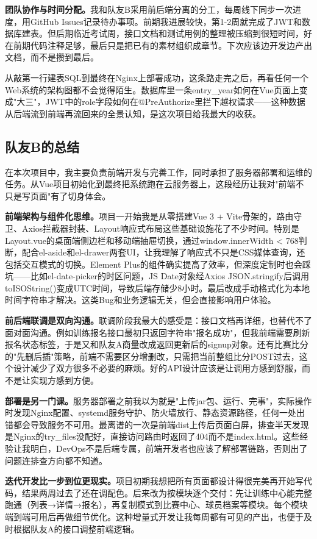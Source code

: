 \documentclass[12pt,a4paper]{ctexart}
\begin{document}
\textbf{团队协作与时间分配。}我和队友B采用前后端分离的分工，每周线下同步一次进度，用GitHub Issues记录待办事项。前期我进展较快，第1-2周就完成了JWT和数据库建表。但后期临近考试周，接口文档和测试用例的整理被压缩到很短时间，好在前期代码注释足够，最后只是把已有的素材组织成章节。下次应该边开发边产出文档，而不是攒到最后。

从敲第一行建表SQL到最终在Nginx上部署成功，这条路走完之后，再看任何一个Web系统的架构图都不会觉得陌生。数据库里一条entry\_year如何在Vue页面上变成"大三"，JWT中的role字段如何在@PreAuthorize里拦下越权请求——这种数据从后端流到前端再流回来的全景认知，是这次项目给我最大的收获。

\subsection{队友B的总结}

在本次项目中，我主要负责前端开发与完善工作，同时承担了服务器部署和运维的任务。从Vue项目初始化到最终把系统跑在云服务器上，这段经历让我对"前端不只是写页面"有了切身体会。

\textbf{前端架构与组件化思维。}项目一开始我是从零搭建Vue 3 + Vite骨架的，路由守卫、Axios拦截器封装、Layout响应式布局这些基础设施花了不少时间。特别是Layout.vue的桌面端侧边栏和移动端抽屉切换，通过window.innerWidth < 768判断，配合el-aside和el-drawer两套UI，让我理解了响应式不只是CSS媒体查询，还包括交互模式的切换。Element Plus的组件确实提高了效率，但深度定制时也会踩坑——比如el-date-picker的时区问题，JS Date对象经Axios JSON.stringify后调用toISOString()变成UTC时间，导致后端存储少8小时。最后改成手动格式化为本地时间字符串才解决。这类Bug和业务逻辑无关，但会直接影响用户体验。

\textbf{前后端联调是双向沟通。}联调阶段我最大的感受是：接口文档再详细，也替代不了面对面沟通。例如训练报名接口最初只返回字符串"报名成功"，但我前端需要刷新报名状态标签，于是又和队友A商量改成返回更新后的signup对象。还有比赛比分的"先删后插"策略，前端不需要区分增删改，只需把当前整组比分POST过去，这个设计减少了双方很多不必要的麻烦。好的API设计应该是让调用方感到舒服，而不是让实现方感到方便。

\textbf{部署是另一门课。}服务器部署之前我以为就是"上传jar包、运行、完事"，实际操作时发现Nginx配置、systemd服务守护、防火墙放行、静态资源路径，任何一处出错都会导致服务不可用。最离谱的一次是前端dist上传后页面白屏，排查半天发现是Nginx的try\_files没配好，直接访问路由时返回了404而不是index.html。这些经验让我明白，DevOps不是后端专属，前端开发者也应该了解部署链路，否则出了问题连排查方向都不知道。

\textbf{迭代开发比一步到位更现实。}项目初期我想把所有页面都设计得很完美再开始写代码，结果两周过去了还在调配色。后来改为按模块逐个交付：先让训练中心能完整跑通（列表→详情→报名），再复制模式到比赛中心、球员档案等模块。每个模块端到端可用后再做细节优化。这种增量式开发让我每周都有可见的产出，也便于及时根据队友A的接口调整前端逻辑。
\end{document}

